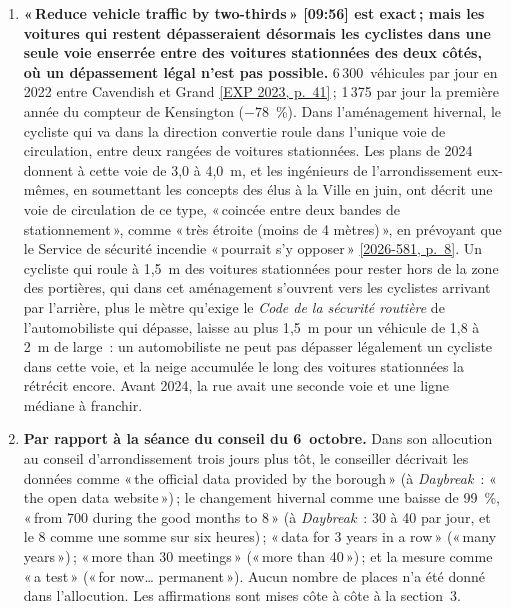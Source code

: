 \documentclass[11pt,letterpaper]{article}
\newcommand{\repourl}{https://github.com/OpenMobilityData/Terrebonne-open-sources}
\newcommand{\pagesurl}{https://openmobilitydata.github.io/Terrebonne-access-requests}
\newcommand{\cliptime}[1]{\textsf{\small[#1]}}
\newcommand{\pgl}[2]{\href{\pagesurl/2026-581/raw/01_emails_mandate_counts.pdf\#page=#1}{\textsf{\small[2026-581, p.~#2]}}}
\newcommand{\pg}[1]{\pgl{#1}{#1}}
\newcommand{\exppg}[1]{\href{\repourl/blob/main/2023-exp-mobility-study/raw/EXP_Etude_de_mobilite_rue_de_Terrebonne_2023.pdf}{\textsf{\small[EXP 2023, p.~#1]}}}
\begin{document}
\begin{enumerate}[nosep]
  \item \begin{minipage}[t]{\linewidth}\textbf{«\,Reduce vehicle traffic by two-thirds\,» \cliptime{09:56} est exact\,; mais les voitures qui restent dépasseraient désormais les cyclistes dans une seule voie enserrée entre des voitures stationnées des deux côtés, où un dépassement légal n'est pas possible.} 6\,300~véhicules par jour en 2022 entre Cavendish et Grand \exppg{41}\,; 1\,375 par jour la première année du compteur de Kensington ($-78$~\%). Dans l'aménagement hivernal, le cycliste qui va dans la direction convertie roule dans l'unique voie de circulation, entre deux rangées de voitures stationnées. Les plans de 2024 donnent à cette voie de 3{,}0 à 4{,}0~m, et les ingénieurs de l'arrondissement eux-mêmes, en soumettant les concepts des élus à la Ville en juin, ont décrit une voie de circulation de ce type, «\,coincée entre deux bandes de stationnement\,», comme «\,très étroite (moins de 4 mètres)\,», en prévoyant que le Service de sécurité incendie «\,pourrait s'y opposer\,» \pg{8}. Un cycliste qui roule à 1{,}5~m des voitures stationnées pour rester hors de la zone des portières, qui dans cet aménagement s'ouvrent vers les cyclistes arrivant par l'arrière, plus le mètre qu'exige le \emph{Code de la sécurité routière} de l'automobiliste qui dépasse, laisse au plus 1{,}5~m pour un véhicule de 1{,}8 à 2~m de large~: un automobiliste ne peut pas dépasser légalement un cycliste dans cette voie, et la neige accumulée le long des voitures stationnées la rétrécit encore. Avant 2024, la rue avait une seconde voie et une ligne médiane à franchir.\end{minipage}\vspace{0.35em}
  \item \begin{minipage}[t]{\linewidth}\textbf{Par rapport à la séance du conseil du 6~octobre.} Dans son allocution au conseil d'arrondissement trois jours plus tôt, le conseiller décrivait les données comme «\,the official data provided by the borough\,» (à \emph{Daybreak}~: «\,the open data website\,»)\,; le changement hivernal comme une baisse de 99~\%, «\,from 700 during the good months to 8\,» (à \emph{Daybreak}~: 30 à 40 par jour, et le 8 comme une somme sur six heures)\,; «\,data for 3 years in a row\,» («\,many years\,»)\,; «\,more than 30 meetings\,» («\,more than 40\,»)\,; et la mesure comme «\,a test\,» («\,for now… permanent\,»). Aucun nombre de places n'a été donné dans l'allocution. Les affirmations sont mises côte à côte à la section~3.\end{minipage}\vspace{0.35em}
\end{enumerate}
\end{document}
